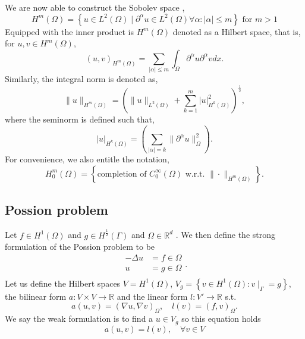 We are now able to construct the Sobolev space \cite{manzoni2021optimal}, \[
H^{m}\left( \Omega  \right) = \left\{ u \in L^{2}\left( \Omega  \right)  \mid  \partial ^{\alpha } u \in L^{2}\left( \Omega  \right)  \forall \alpha : \left\lvert \alpha  \right\rvert  \le m \right\} \text{ for } m>1
\]
Equipped with the inner product is $H^{m}\left( \Omega  \right) $  denoted as a Hilbert space, that is, for $u,v \in H^{m}\left( \Omega  \right) $, \[
    \left( u,v \right) _{H^{m}\left( \Omega   \right) } = \sum_{\left\lvert \alpha  \right\rvert  \le  m}^{}  \int_{\Omega }^{} \partial ^{\alpha } u \partial ^{\alpha } v dx.
\]
Similarly, the integral norm is denoted as, \[
\| u \|_{ H^{m}\left( \Omega  \right)  }^{  }  = \left( \| u \|_{ L^{2}\left( \Omega  \right)    } + \sum_{k = 1}^{m}  \left\lvert u \right\rvert ^{2} _{  H^{k}\left( \Omega  \right) }\right) ^{\frac{1}{2}},
\]
where the seminorm is defined such that, \[
\left\lvert u \right\rvert _{H^{k}\left( \Omega  \right) } = \left( \sum_{\left\lvert \alpha  \right\rvert  = k}^{} \| \partial ^{\alpha }u \|_{ \Omega  }^{ 2 }  \right).
\]
For convenience, we also entitle the notation,
\[
H^{m}_{0} \left( \Omega  \right) = \left\{ \text{completion of }C_{0}^{\infty}\left( \Omega  \right) \text{ w.r.t. } \| \cdot  \|_{H^{m}\left( \Omega  \right)   }^{  }  \right\}.
\]


\subsection{Possion problem}%
\label{sub:possion_problem}

Let $f \in H^1( \Omega ) $ and $g \in H^{\frac{1}{2}}( \Gamma ) $ and $\Omega  \in \mathbb{R} ^{d}$ . We then define the strong formulation of the Possion problem to be \[
\begin{split}
    -\Delta u &= f \in \Omega  \\
     u &= g \in \Omega  \\
\end{split} .
\]
Let us define the Hilbert spaces $V=H^{1}( \Omega ) $,   $V_{g} = \left\{ v \in H^{1}( \Omega ): v \mid _{\Gamma } = g \right\} $, the bilinear form $a: V \times V  \to \mathbb{R}  $ and the linear form $l: V'\to \mathbb{R}  $ s.t. \[
a( u,v) = ( \nabla u, \nabla v) _{\Omega }, \quad l( v) = (f,v)_{\Omega }.
\]
We say the weak formulation is to find a $u \in V_{g}$ so this equation holds  \[
a( u,v) = l( v), \quad  \forall v \in V
\]








